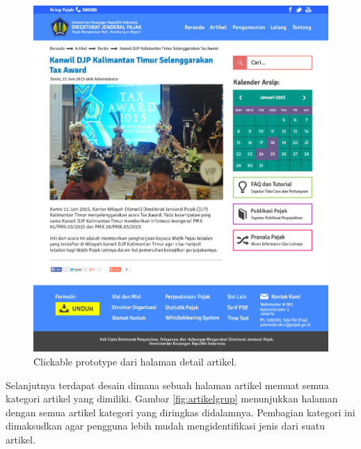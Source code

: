 \begin{enumerate}
\begin{figure}
			\centering
			\includegraphics[width=\textwidth]
			{pics/Artikel.jpg}
			\caption{\f{Clickable prototype} dari halaman detail artikel.}
			\label{fig:artikel}
		\end{figure}
	\pagebreak
	Selanjutnya terdapat desain dimana sebuah halaman artikel memuat semua kategori artikel yang dimiliki. Gambar \ref{fig:artikelgrup} menunjukkan halaman dengan semua artikel kategori yang diringkas didalamnya. Pembagian kategori ini dimaksudkan agar pengguna lebih mudah mengidentifikasi jenis dari suatu artikel.
		\begin{figure}
			\centering

\end{figure}
\end{enumerate}
